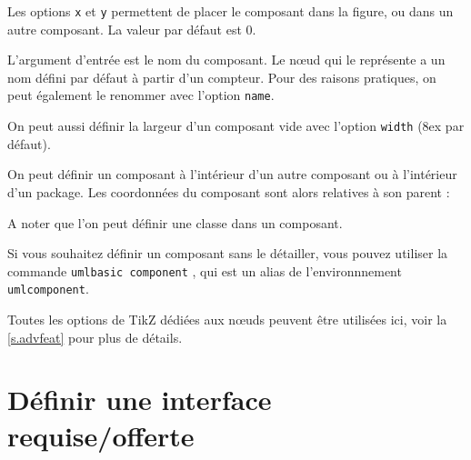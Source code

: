 \documentclass[a4paper,11pt]{report}
\newcommand{\inputTikZ}[1]{%
  }%
\newcommand{\inputTikZ}[1]{%
    \texttt{[image: fig/\#1.pdf]}%
  }%
\newcommand{\TikZ}{{\sc TikZ}}
\begin{document}
\medskip

\begin{minipage}{0.51\textwidth}

\end{minipage}
\begin{minipage}{0.49\textwidth}
\begin{center}
\inputTikZ{component}
\end{center}
\end{minipage}

\medskip

Les options {\tt x} et {\tt y} permettent de placer le composant dans la figure, ou dans un autre composant. La valeur par défaut est 0. 

L'argument d'entrée est le nom du composant. Le n\oe{}ud qui le représente a un nom défini par défaut à partir d'un compteur. Pour des raisons pratiques, on peut également le renommer avec l'option {\tt name}.

\medskip

On peut aussi définir la largeur d'un composant vide avec l'option {\tt width} (8ex par défaut).

\medskip

On peut définir un composant à l'intérieur d'un autre composant ou à l'intérieur d'un package. Les coordonnées du composant sont alors relatives à son parent :

\medskip

\begin{minipage}{0.51\textwidth}

\end{minipage}
\begin{minipage}{0.49\textwidth}
\begin{center}
\inputTikZ{componentinner}
\end{center}
\end{minipage}

\medskip

A noter que l'on peut définir une classe dans un composant.

\medskip

Si vous souhaitez définir un composant sans le détailler, vous pouvez utiliser la commande {\tt umlbasic component} , qui est un alias de l'environnnement {\tt umlcomponent}.

\medskip

Toutes les options de \TikZ{} dédiées aux n\oe{}uds peuvent être utilisées ici, voir la \autoref{s.advfeat} pour plus de détails.

\section{Définir une interface requise/offerte}
\end{document}
